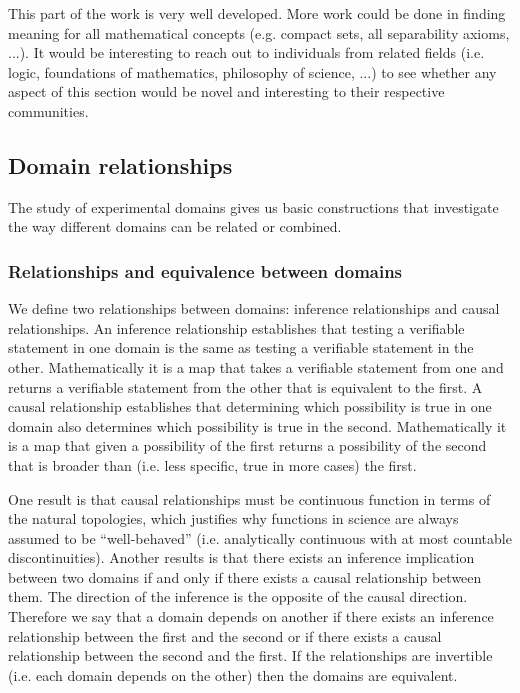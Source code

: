 \documentclass[twocolumn]{article}
\begin{document}
This part of the work is very well developed. More work could be done in finding meaning for all mathematical concepts (e.g. compact sets, all separability axioms, ...). It would be interesting to reach out to individuals from related fields (i.e. logic, foundations of mathematics, philosophy of science, ...) to see whether any aspect of this section would be novel and interesting to their respective communities.

\subsection{Domain relationships}

The study of experimental domains gives us basic constructions that investigate the way different domains can be related or combined.

\subsubsection{Relationships and equivalence between domains}

We define two relationships between domains: inference relationships and causal relationships. An inference relationship establishes that testing a verifiable statement in one domain is the same as testing a verifiable statement in the other. Mathematically it is a map that takes a verifiable statement from one and returns a verifiable statement from the other that is equivalent to the first. A causal relationship establishes that determining which possibility is true in one domain also determines which possibility is true in the second. Mathematically it is a map that given a possibility of the first returns a possibility of the second that is broader than (i.e. less specific, true in more cases) the first.

One result is that causal relationships must be continuous function in terms of the natural topologies, which justifies why functions in science are always assumed to be ``well-behaved'' (i.e. analytically continuous with at most countable discontinuities). Another results is that there exists an inference implication between two domains if and only if there exists a causal relationship between them. The direction of the inference is the opposite of the causal direction. Therefore we say that a domain depends on another if there exists an inference relationship between the first and the second or if there exists a causal relationship between the second and the first. If the relationships are invertible (i.e. each domain depends on the other) then the domains are equivalent.
\end{document}
